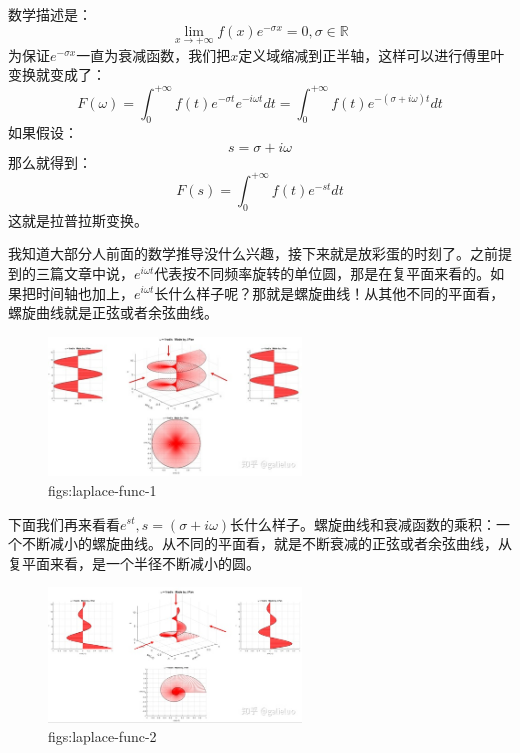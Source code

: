 \documentclass[lang=cn,11pt,a4paper,cite=numbers]{elegantpaper}
\begin{document}
  数学描述是：
\begin{equation}
  \lim_{x{\to}+{\infty}}f(x)e^{-{\sigma}x}=0,{\sigma}{\in}{\mathbb{R}}
\end{equation}
为保证$e^{-{\sigma}x}$一直为衰减函数，我们把$x$定义域缩减到正半轴，这样可以进行傅里叶变换就变成了：
\begin{equation}
  F({\omega})={\int}_{0}^{+\infty}f(t)e^{-{\sigma}t}e^{-i{\omega}t}dt=\int_{0}^{+\infty}f(t)e^{-({\sigma}+i{\omega})t}dt
\end{equation}
如果假设：
\begin{equation}
  s={\sigma}+i{\omega}
\end{equation}
那么就得到：
\begin{equation}
  F(s)=\int_{0}^{+\infty}f(t)e^{-st}dt
\end{equation}
这就是拉普拉斯变换。

  我知道大部分人前面的数学推导没什么兴趣，接下来就是放彩蛋的时刻了。之前提到的三篇文章\cite{fourier-transform-secret,nature-e-engineer-1,euler-formula}中说，$e^{i{\omega}t}$代表按不同频率旋转的单位圆，那是在复平面来看的。如果把时间轴也加上，$e^{i{\omega}t}$长什么样子呢？那就是螺旋曲线！从其他不同的平面看，螺旋曲线就是正弦或者余弦曲线。
\begin{figure}[!htb]
  \centering
  \includegraphics[width=0.6\textwidth]{figs/laplace-func-1.png}
  \caption{figs:laplace-func-1}
  \label{figs:laplace-func-1}
\end{figure}

  下面我们再来看看$e^{st},s=({\sigma}+i{\omega})$长什么样子。螺旋曲线和衰减函数的乘积：一个不断减小的螺旋曲线。从不同的平面看，就是不断衰减的正弦或者余弦曲线，从复平面来看，是一个半径不断减小的圆。
\begin{figure}[!htb]
  \centering
  \includegraphics[width=0.6\textwidth]{figs/laplace-func-2.png}
  \caption{figs:laplace-func-2}
  \label{figs:laplace-func-2}
\end{figure}
\end{document}
